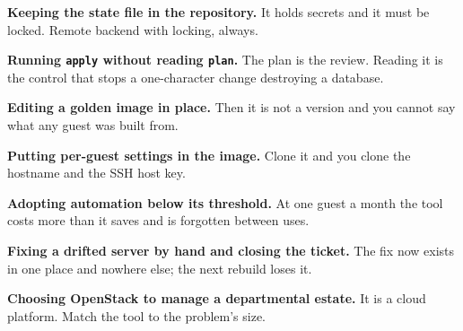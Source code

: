 \begin{pitfall}
\begin{tight}
  \item \textbf{Keeping the state file in the repository.} It holds secrets and
        it must be locked. Remote backend with locking, always.
  \item \textbf{Running \texttt{apply} without reading \texttt{plan}.} The plan
        is the review. Reading it is the control that stops a one-character
        change destroying a database.
  \item \textbf{Editing a golden image in place.} Then it is not a version and
        you cannot say what any guest was built from.
  \item \textbf{Putting per-guest settings in the image.} Clone it and you
        clone the hostname and the SSH host key.
  \item \textbf{Adopting automation below its threshold.} At one guest a month
        the tool costs more than it saves and is forgotten between uses.
  \item \textbf{Fixing a drifted server by hand and closing the ticket.} The
        fix now exists in one place and nowhere else; the next rebuild loses
        it.
  \item \textbf{Choosing OpenStack to manage a departmental estate.} It is a
        cloud platform. Match the tool to the problem's size.
\end{tight}
\end{pitfall}


